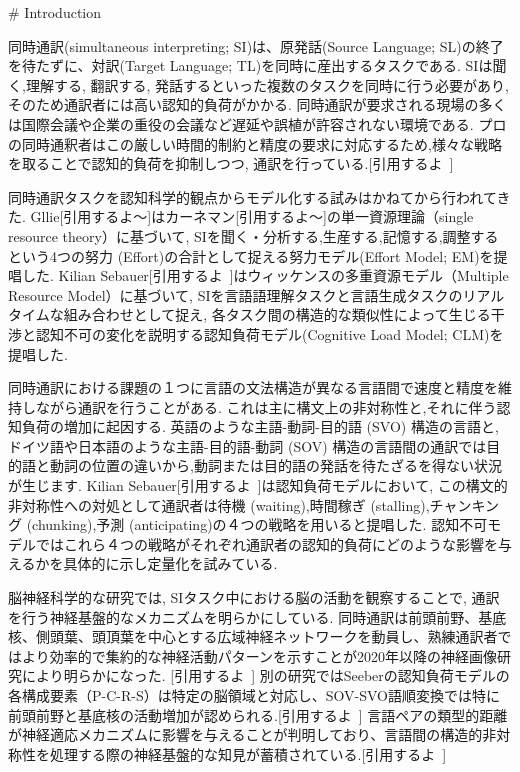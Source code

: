 # Introduction

同時通訳(simultaneous interpreting; SI)は、原発話(Source Language; SL)の終了を待たずに、対訳(Target Language; TL)を同時に産出するタスクである.
SIは聞く,理解する, 翻訳する, 発話するといった複数のタスクを同時に行う必要があり, そのため通訳者には高い認知的負荷がかかる. 
同時通訳が要求される現場の多くは国際会議や企業の重役の会議など遅延や誤植が許容されない環境である.
プロの同時通釈者はこの厳しい時間的制約と精度の要求に対応するため,様々な戦略を取ることで認知的負荷を抑制しつつ, 通訳を行っている.[引用するよ~]

同時通訳タスクを認知科学的観点からモデル化する試みはかねてから行われてきた.
Gllie[引用するよ〜]はカーネマン[引用するよ〜]の単一資源理論（single resource theory）に基づいて, SIを聞く・分析する,生産する,記憶する,調整するという4つの努力 (Effort)の合計として捉える努力モデル(Effort Model; EM)を提唱した.
Kilian Sebauer[引用するよ~]はウィッケンスの多重資源モデル（Multiple Resource Model）に基づいて, SIを言語語理解タスクと言語生成タスクのリアルタイムな組み合わせとして捉え, 各タスク間の構造的な類似性によって生じる干渉と認知不可の変化を説明する認知負荷モデル(Cognitive Load Model; CLM)を提唱した.

同時通訳における課題の１つに言語の文法構造が異なる言語間で速度と精度を維持しながら通訳を行うことがある.
これは主に構文上の非対称性と,それに伴う認知負荷の増加に起因する.
英語のような主語-動詞-目的語 (SVO) 構造の言語と, ドイツ語や日本語のような主語-目的語-動詞 (SOV) 構造の言語間の通訳では目的語と動詞の位置の違いから,動詞または目的語の発話を待たざるを得ない状況が生じます.
Kilian Sebauer[引用するよ~]は認知負荷モデルにおいて, この構文的非対称性への対処として通訳者は待機 (waiting),時間稼ぎ (stalling),チャンキング (chunking),予測 (anticipating)の４つの戦略を用いると提唱した.
認知不可モデルではこれら４つの戦略がそれぞれ通訳者の認知的負荷にどのような影響を与えるかを具体的に示し定量化を試みている.

脳神経科学的な研究では, SIタスク中における脳の活動を観察することで, 通訳を行う神経基盤的なメカニズムを明らかにしている.
同時通訳は前頭前野、基底核、側頭葉、頭頂葉を中心とする広域神経ネットワークを動員し、熟練通訳者ではより効率的で集約的な神経活動パターンを示すことが2020年以降の神経画像研究により明らかになった. [引用するよ~]
別の研究ではSeeberの認知負荷モデルの各構成要素（P-C-R-S）は特定の脳領域と対応し、SOV-SVO語順変換では特に前頭前野と基底核の活動増加が認められる.[引用するよ~]
言語ペアの類型的距離が神経適応メカニズムに影響を与えることが判明しており、言語間の構造的非対称性を処理する際の神経基盤的な知見が蓄積されている.[引用するよ~]

